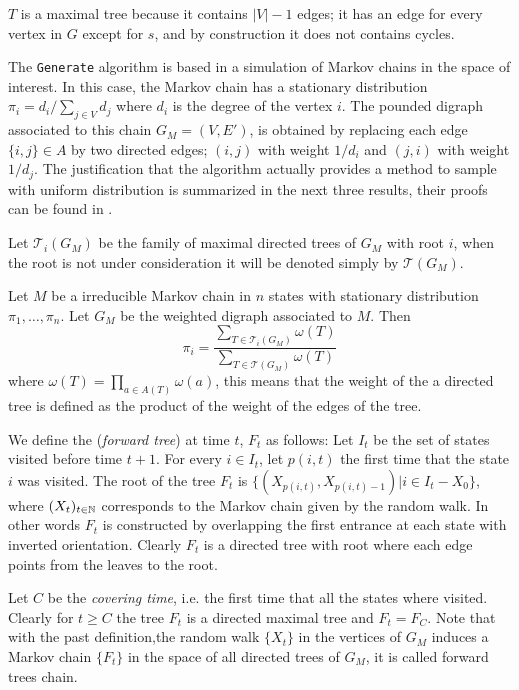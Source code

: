 $T$ is a maximal tree because it contains $|V| - 1$ edges; it has an edge for every vertex in $G$ except for $s$, and by construction it does not contains cycles.

The \texttt{Generate} algorithm is based in a simulation of Markov chains in the space of interest. In this case, the Markov chain has a stationary distribution $\pi_{i}=d_{i}/\sum_{j\in V} d_{j}$ where $d_{i}$ is the degree of the vertex $i$. The pounded digraph associated to this chain $G_M =(V,E')$, is obtained by replacing each edge $\{i,j\}\in A$ by two directed edges; $(i,j)$ with weight $1/d_{i}$ and $(j,i)$ with weight $1/d_{j}$. The justification that the algorithm actually provides a method to sample with uniform distribution is summarized in the next three results, their proofs can be found in \cite{Broder89}.

Let $\mathcal{T}_{i}(G_{M})$ be the family of maximal directed trees of $G_{M}$ with root $i$, when the root is not under consideration it will be denoted simply by $\mathcal{T}(G_{M})$.

\begin{theorem}
Let $M$ be a irreducible Markov chain in $n$ states with stationary distribution $\pi_1, \dots, \pi_n$. Let $G_{M}$ be the weighted digraph associated to $M$. Then $$\pi_{i} = \frac{\sum_{ T \in \mathcal{T}_{i}(G_{M})} \omega (T)}{\sum _{T \in \mathcal{T}(G_{M})} \omega (T)}$$
where $\omega(T) = \prod_{a\in A(T)}\omega(a)$, this means that the weight of the a directed tree is defined as the product of the weight of the edges of the tree.
\end{theorem}

We define the (\textit{forward tree}) at time $t$, $F_{t}$ as follows: Let $I_{t}$ be the set of states visited before time $t+1$. For every $i\in I_{t}$, let $p(i,t)$ the first time that the state $i$ was visited. The root of the tree $F_{t}$ is $\{(X_{p(i,t)},X_{p(i,t)-1}) | i\in I_{t}-X_{0}\}$, where $(X_{t})_{t\in \mathbb{N}}$ corresponds to the Markov chain given by the random walk. In other words $F_{t}$ is constructed by overlapping the first entrance at each state with inverted orientation. Clearly $F_{t}$ is a directed tree with root where each edge points from the leaves to the root.

Let $C$ be the \textit{covering time}, i.e. the first time that all the states where visited. Clearly for $t\geq C$ the tree $F_{t}$ is a directed maximal tree and $F_{t}=F_{C}$. Note that with the past definition,the random walk $\{X_{t}\}$ in the vertices of $G_{M}$ induces a Markov chain $\{F_{t}\}$ in the space of all directed trees of $G_{M}$, it is called forward trees chain.

